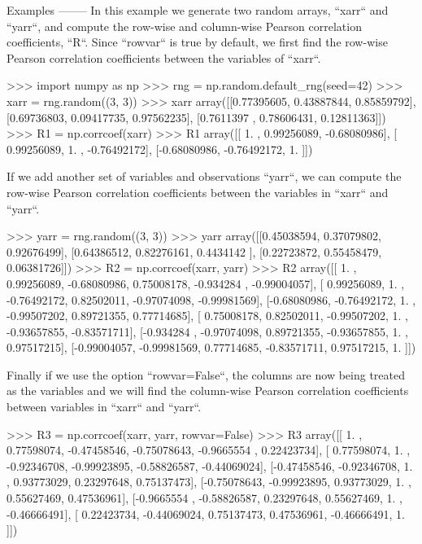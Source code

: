 \begin{DoxyVerb}
Examples
--------
In this example we generate two random arrays, ``xarr`` and ``yarr``, and
compute the row-wise and column-wise Pearson correlation coefficients,
``R``. Since ``rowvar`` is  true by  default, we first find the row-wise
Pearson correlation coefficients between the variables of ``xarr``.

>>> import numpy as np
>>> rng = np.random.default_rng(seed=42)
>>> xarr = rng.random((3, 3))
>>> xarr
array([[0.77395605, 0.43887844, 0.85859792],
       [0.69736803, 0.09417735, 0.97562235],
       [0.7611397 , 0.78606431, 0.12811363]])
>>> R1 = np.corrcoef(xarr)
>>> R1
array([[ 1.        ,  0.99256089, -0.68080986],
       [ 0.99256089,  1.        , -0.76492172],
       [-0.68080986, -0.76492172,  1.        ]])

If we add another set of variables and observations ``yarr``, we can
compute the row-wise Pearson correlation coefficients between the
variables in ``xarr`` and ``yarr``.

>>> yarr = rng.random((3, 3))
>>> yarr
array([[0.45038594, 0.37079802, 0.92676499],
       [0.64386512, 0.82276161, 0.4434142 ],
       [0.22723872, 0.55458479, 0.06381726]])
>>> R2 = np.corrcoef(xarr, yarr)
>>> R2
array([[ 1.        ,  0.99256089, -0.68080986,  0.75008178, -0.934284  ,
        -0.99004057],
       [ 0.99256089,  1.        , -0.76492172,  0.82502011, -0.97074098,
        -0.99981569],
       [-0.68080986, -0.76492172,  1.        , -0.99507202,  0.89721355,
         0.77714685],
       [ 0.75008178,  0.82502011, -0.99507202,  1.        , -0.93657855,
        -0.83571711],
       [-0.934284  , -0.97074098,  0.89721355, -0.93657855,  1.        ,
         0.97517215],
       [-0.99004057, -0.99981569,  0.77714685, -0.83571711,  0.97517215,
         1.        ]])

Finally if we use the option ``rowvar=False``, the columns are now
being treated as the variables and we will find the column-wise Pearson
correlation coefficients between variables in ``xarr`` and ``yarr``.

>>> R3 = np.corrcoef(xarr, yarr, rowvar=False)
>>> R3
array([[ 1.        ,  0.77598074, -0.47458546, -0.75078643, -0.9665554 ,
         0.22423734],
       [ 0.77598074,  1.        , -0.92346708, -0.99923895, -0.58826587,
        -0.44069024],
       [-0.47458546, -0.92346708,  1.        ,  0.93773029,  0.23297648,
         0.75137473],
       [-0.75078643, -0.99923895,  0.93773029,  1.        ,  0.55627469,
         0.47536961],
       [-0.9665554 , -0.58826587,  0.23297648,  0.55627469,  1.        ,
        -0.46666491],
       [ 0.22423734, -0.44069024,  0.75137473,  0.47536961, -0.46666491,
         1.        ]])\end{DoxyVerb}
 \mbox{\label{namespacenumpy_1_1lib_1_1function__base_a9d5a9207424b666ee843b21bf1bd1c99}} 
